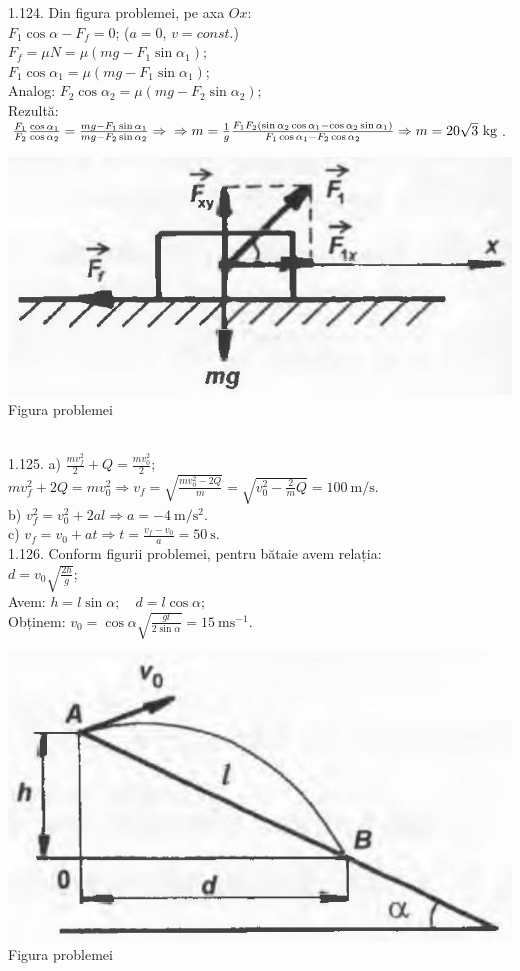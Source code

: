1.124. Din figura problemei, pe axa $Ox$:\\ $F_{1} \cos \alpha-F_{f}=0$; ($a=0$, $v=const.$)\\ $F_{f}=\mu N=\mu\left(m g-F_{1} \sin \alpha_{1}\right)$;\\ $F_{1} \cos \alpha_{1}=\mu\left(m g-F_{1} \sin \alpha_{1}\right)$;\\ Analog: $F_{2} \cos \alpha_{2}=\mu\left(m g-F_{2} \sin \alpha_{2}\right)$;\\ Rezultă: $\frac{F_{1}}{F_{2}} \frac{\cos \alpha_{1}}{\cos \alpha_{2}}=\frac{m g-F_{1} \sin \alpha_{1}}{m g-F_{2} \sin \alpha_{2}} \Rightarrow\\ \Rightarrow m=\frac{1}{g} \frac{F_{1} F_{2}\left(\sin \alpha_{2} \cos \alpha_{1}-\cos \alpha_{2} \sin \alpha_{1}\right)}{F_{1} \cos \alpha_{1}-F_{2} \cos \alpha_{2}} \Rightarrow m=20 \sqrt{3} \mathrm{~kg}$.\\ \begin{center} \includegraphics[width=0.4\linewidth]{images/2025_07_01_5b3ff9fa0d508c8e9f17g-224(1)}\\ Figura problemei \end{center}\\

1.125. a) $\frac{m v_{f}^{2}}{2}+Q=\frac{m v_{0}^{2}}{2}$;\\ $m v_{f}^{2}+2 Q=m v_{0}^{2} \Rightarrow v_{f}=\sqrt{\frac{m v_{0}^{2}-2 Q}{m}}=\sqrt{v_{0}^{2}-\frac{2}{m} Q}=100 \mathrm{~m} / \mathrm{s}$.\\ b) $v_{f}^{2}=v_{0}^{2}+2 a l \Rightarrow a=-4 \mathrm{~m} / \mathrm{s}^{2}$.\\ c) $v_{f}=v_{0}+a t \Rightarrow t=\frac{v_{f}-v_{0}}{a}=50 \mathrm{~s}$.\\

1.126. Conform figurii problemei, pentru bătaie avem relația:\\ $d=v_{0} \sqrt{\frac{2 h}{g}}$;\\ Avem: $h=l \sin \alpha; \quad d=l \cos \alpha$;\\ Obținem: $v_{0}=\cos \alpha \sqrt{\frac{g l}{2 \sin \alpha}}=15 \mathrm{~ms}^{-1}$.\\ \begin{center} \includegraphics[width=0.4\linewidth]{images/2025_07_01_5b3ff9fa0d508c8e9f17g-225(1)}\\ Figura problemei \end{center}\\

